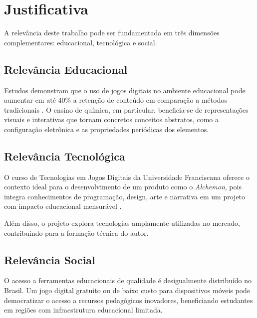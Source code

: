 
\section{Justificativa}

A relevância deste trabalho pode ser fundamentada em três dimensões
complementares: educacional, tecnológica e social.

\subsection{Relevância Educacional}

Estudos demonstram que o uso de jogos digitais no ambiente educacional pode
aumentar em até 40\% a retenção de conteúdo em comparação a métodos tradicionais
\cite{gee2003videogames}. O ensino de química, em particular, beneficia-se de
representações visuais e interativas que tornam concretos conceitos abstratos,
como a configuração eletrônica e as propriedades periódicas dos elementos.


\subsection{Relevância Tecnológica}

O curso de Tecnologias em Jogos Digitais da Universidade Franciscana oferece
o contexto ideal para o desenvolvimento de um produto como o \textit{Alchemon},
pois integra conhecimentos de programação, design, arte e narrativa em um
projeto com impacto educacional mensurável \cite{mayer2019serious}.

Além disso, o projeto explora tecnologias amplamente utilizadas no mercado,
contribuindo para a formação técnica do autor.


\subsection{Relevância Social}

O acesso a ferramentas educacionais de qualidade é desigualmente distribuído
no Brasil. Um jogo digital gratuito ou de baixo custo para dispositivos móveis
pode democratizar o acesso a recursos pedagógicos inovadores, beneficiando
estudantes em regiões com infraestrutura educacional limitada.

